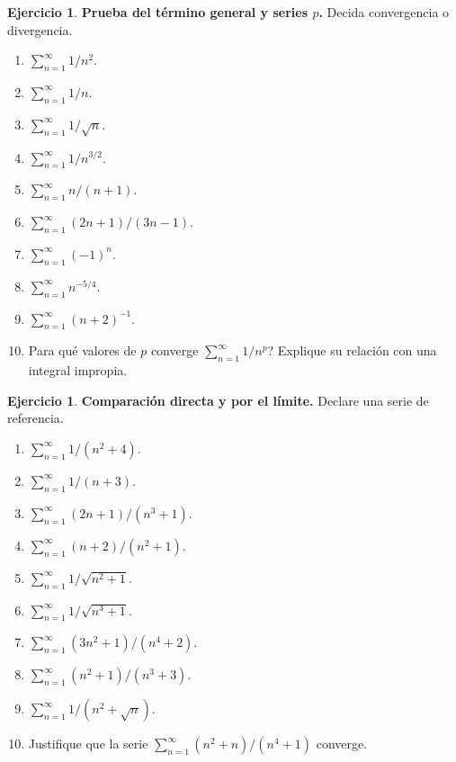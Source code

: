 \documentclass[12pt]{article}
\theoremstyle{definition}
\newtheorem{Ejer}[teorema]{Ejercicio}
\theoremstyle{remark}
\begin{document}
\begin{Ejer}\textbf{Prueba del término general y series $p$.} Decida convergencia o divergencia.
\begin{enumerate}[resume=banco4]
\item $\displaystyle\sum_{n=1}^\infty 1/n^2$.
\item $\displaystyle\sum_{n=1}^\infty 1/n$.
\item $\displaystyle\sum_{n=1}^\infty 1/\sqrt n$.
\item $\displaystyle\sum_{n=1}^\infty 1/n^{3/2}$.
\item $\displaystyle\sum_{n=1}^\infty n/(n+1)$.
\item $\displaystyle\sum_{n=1}^\infty (2n+1)/(3n-1)$.
\item $\displaystyle\sum_{n=1}^\infty (-1)^n$.
\item $\displaystyle\sum_{n=1}^\infty n^{-5/4}$.
\item $\displaystyle\sum_{n=1}^\infty (n+2)^{-1}$.
\item Para qué valores de $p$ converge $\displaystyle\sum_{n=1}^\infty 1/n^p$? Explique su relación con una integral impropia.
\end{enumerate}
\end{Ejer}

\begin{Ejer}\textbf{Comparación directa y por el límite.} Declare una serie de referencia.
\begin{enumerate}[resume=banco4]
\item $\displaystyle\sum_{n=1}^\infty 1/(n^2+4)$.
\item $\displaystyle\sum_{n=1}^\infty 1/(n+3)$.
\item $\displaystyle\sum_{n=1}^\infty (2n+1)/(n^3+1)$.
\item $\displaystyle\sum_{n=1}^\infty (n+2)/(n^2+1)$.
\item $\displaystyle\sum_{n=1}^\infty 1/\sqrt{n^2+1}$.
\item $\displaystyle\sum_{n=1}^\infty 1/\sqrt{n^3+1}$.
\item $\displaystyle\sum_{n=1}^\infty (3n^2+1)/(n^4+2)$.
\item $\displaystyle\sum_{n=1}^\infty (n^2+1)/(n^3+3)$.
\item $\displaystyle\sum_{n=1}^\infty 1/(n^2+\sqrt n)$.
\item Justifique que la serie $\sum_{n=1}^\infty (n^2+n)/(n^4+1)$ converge.
\end{enumerate}
\end{Ejer}
\end{document}
